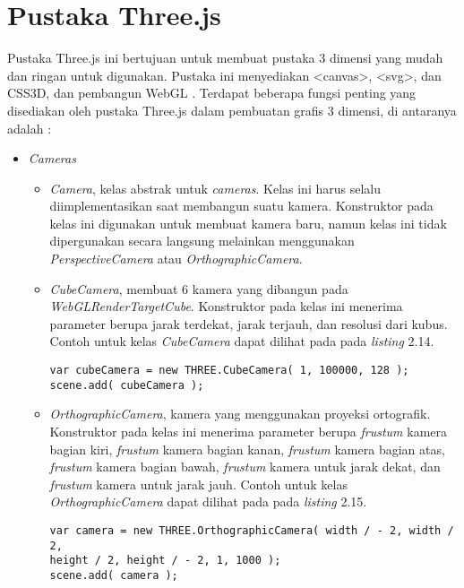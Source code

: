 \section{Pustaka Three.js}
\label{sec:latex}
Pustaka Three.js ini bertujuan untuk membuat pustaka 3 dimensi yang mudah dan ringan untuk digunakan. Pustaka ini menyediakan <canvas>, <svg>, dan CSS3D, dan pembangun WebGL \cite{githubthreejs}.
Terdapat beberapa fungsi penting yang disediakan oleh pustaka Three.js dalam pembuatan grafis 3 dimensi, di antaranya adalah \cite{threejs}:
\begin{itemize}

\item \textit{Cameras}

	\begin{itemize}
	\item {\it Camera}, kelas abstrak untuk {\it cameras}. Kelas ini harus selalu diimplementasikan saat membangun suatu kamera. Konstruktor pada kelas ini digunakan untuk membuat kamera baru, namun kelas ini tidak dipergunakan secara langsung melainkan menggunakan {\it PerspectiveCamera} atau {\it OrthographicCamera}.
	
	\item {\it CubeCamera}, membuat 6 kamera yang dibangun pada {\it WebGLRenderTargetCube}. Konstruktor pada kelas ini menerima parameter berupa jarak terdekat, jarak terjauh, dan resolusi dari kubus. Contoh untuk kelas {\it CubeCamera} dapat dilihat pada pada {\it listing} 2.14.
	\begin{lstlisting}[caption={Contoh instansiasi kelas {\it CubeCamera}.},captionpos=b]
var cubeCamera = new THREE.CubeCamera( 1, 100000, 128 );
scene.add( cubeCamera );
\end{lstlisting}
	
	\item{\it OrthographicCamera}, kamera yang menggunakan proyeksi ortografik. Konstruktor pada kelas ini menerima parameter berupa {\it frustum} kamera bagian kiri, {\it frustum} kamera bagian kanan, {\it frustum} kamera bagian atas, {\it frustum} kamera bagian bawah, {\it frustum} kamera untuk jarak dekat, dan {\it frustum} kamera untuk jarak jauh. Contoh untuk kelas {\it OrthographicCamera} dapat dilihat pada pada {\it listing} 2.15.
\begin{lstlisting}[caption={Contoh instansiasi kelas {\it OrthographicCamera}},captionpos=b]
var camera = new THREE.OrthographicCamera( width / - 2, width / 2, 
height / 2, height / - 2, 1, 1000 );
scene.add( camera );
\end{lstlisting}
	

\end{itemize}
\end{itemize}
